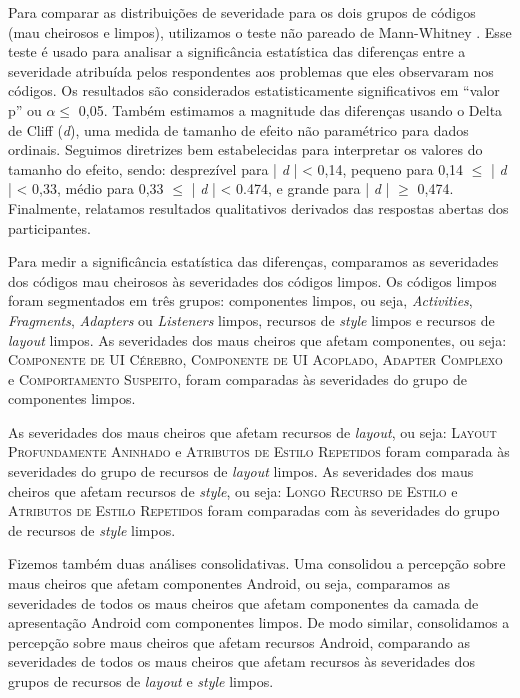 Para comparar as distribuições de severidade para os dois grupos de códigos (mau cheirosos e limpos), utilizamos o teste não pareado de Mann-Whitney \cite{Conover:99}. Esse teste é usado para analisar a significância estatística das diferenças entre a severidade atribuída pelos respondentes aos problemas que eles observaram nos códigos. Os resultados são considerados estatisticamente significativos em ``valor p'' ou $\alpha \leq$  0,05. Também estimamos a magnitude das diferenças usando o Delta de Cliff (\textit{d}), uma medida de tamanho de efeito não paramétrico \cite{EffectSize:05} para dados ordinais. Seguimos diretrizes bem estabelecidas \cite{EffectSize:05} para interpretar os valores do tamanho do efeito, sendo: desprezível para | \textit{d} | < 0,14, pequeno para 0,14 $\leq$ | \textit{d} | < 0,33, médio para 0,33 $\leq$ | \textit{d} | < 0.474, e grande para | \textit{d} | $\geq$ 0,474. Finalmente, relatamos resultados qualitativos derivados das respostas abertas dos participantes.

Para medir a significância estatística das diferenças, comparamos as severidades dos códigos mau cheirosos às severidades dos códigos limpos. Os códigos limpos foram segmentados em três grupos: componentes limpos, ou seja, \textit{Activities}, \textit{Fragments}, \textit{Adapters} ou \textit{Listeners} limpos, recursos de \textit{style} limpos e recursos de \textit{layout} limpos. As severidades dos maus cheiros que afetam componentes, ou seja: \textsc{\small Componente de UI Cérebro}, \textsc{\small Componente de UI Acoplado}, \textsc{\small Adapter Complexo} e \textsc{\small Comportamento Suspeito}, foram comparadas às severidades do grupo de componentes limpos. 

As severidades dos maus cheiros que afetam recursos de \textit{layout}, ou seja: \textsc{\small Layout Profundamente Aninhado} e \textsc{\small Atributos de Estilo Repetidos} foram comparada às severidades do grupo de recursos de \textit{layout} limpos. As severidades dos maus cheiros que afetam recursos de \textit{style}, ou seja: \textsc{\small Longo Recurso de Estilo} e \textsc{\small Atributos de Estilo Repetidos} foram comparadas com às severidades do grupo de recursos de \textit{style} limpos.

Fizemos também duas análises consolidativas. Uma consolidou a percepção sobre maus cheiros que afetam componentes Android, ou seja, comparamos as severidades de todos os maus cheiros que afetam componentes da camada de apresentação Android com componentes limpos. De modo similar, consolidamos a percepção sobre maus cheiros que afetam recursos Android, comparando as severidades de todos os maus cheiros que afetam recursos às severidades dos grupos de recursos de \textit{layout} e \textit{style} limpos.




